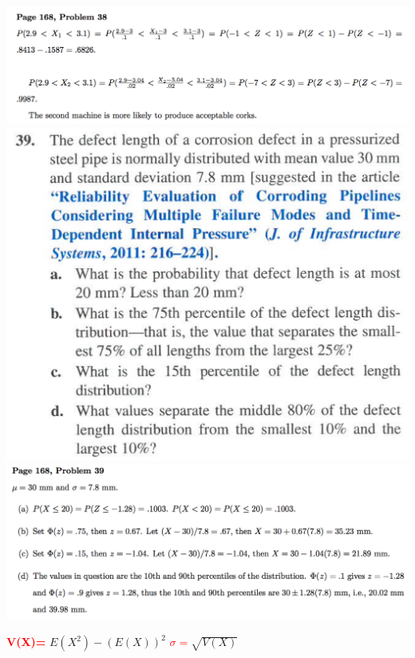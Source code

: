 \documentclass[9pt]{extarticle}
\newcommand{\re}[1]{\textcolor{red}{\textbf{#1}}}
\begin{document}
	\includegraphics[scale=0.5]{31a.png}
	\includegraphics[scale=0.21]{39.png}
	\includegraphics[scale=0.5]{39a.png}
	
	
	
	
	
	
	
	\pagebreak
	\re{V(X)=} $E(X^{2})-(E(X))^{2}$
	\re{$\sigma =$}$\sqrt{V(X)}$
	
	
\end{document}
